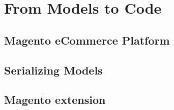 \chead{}
\chapter{From Models to Code}

\section{Magento eCommerce Platform}

\section{Serializing Models}

\section{Magento extension}


